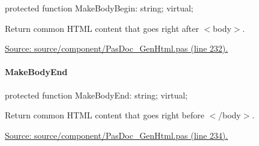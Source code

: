 \documentclass{report}
\newif\ifpdf
\begin{document}
\label{PasDoc_GenHtml.TGenericHTMLDocGenerator-MakeBodyBegin}
\begin{list}{}{
\setlength{\itemindent}{0cm}
\setlength{\listparindent}{0cm}
\setlength{\leftmargin}{\evensidemargin}
\addtolength{\leftmargin}{\tmplength}
\settowidth{\labelsep}{X}
\addtolength{\leftmargin}{\labelsep}
\setlength{\labelwidth}{\tmplength}
}
\item[\textbf{Declaration}\hfill]
\ifpdf
\begin{flushleft}
\fi
\begin{ttfamily}
protected function MakeBodyBegin: string; virtual;\end{ttfamily}

\ifpdf
\end{flushleft}
\fi

\par
\item[\textbf{Description}]
Return common HTML content that goes right after {$<$}body{$>$}.\par
\href{https://github.com/pasdoc/pasdoc/blob/master/source/component/PasDoc_GenHtml.pas#L232}{Source: source/component/PasDoc{\_}GenHtml.pas (line 232).}

\end{list}
\paragraph*{MakeBodyEnd}\hspace*{\fill}

\label{PasDoc_GenHtml.TGenericHTMLDocGenerator-MakeBodyEnd}
\begin{list}{}{
\setlength{\itemindent}{0cm}
\setlength{\listparindent}{0cm}
\setlength{\leftmargin}{\evensidemargin}
\addtolength{\leftmargin}{\tmplength}
\settowidth{\labelsep}{X}
\addtolength{\leftmargin}{\labelsep}
\setlength{\labelwidth}{\tmplength}
}
\item[\textbf{Declaration}\hfill]
\ifpdf
\begin{flushleft}
\fi
\begin{ttfamily}
protected function MakeBodyEnd: string; virtual;\end{ttfamily}

\ifpdf
\end{flushleft}
\fi

\par
\item[\textbf{Description}]
Return common HTML content that goes right before {$<$}/body{$>$}.\par
\href{https://github.com/pasdoc/pasdoc/blob/master/source/component/PasDoc_GenHtml.pas#L234}{Source: source/component/PasDoc{\_}GenHtml.pas (line 234).}

\end{list}
\end{document}

